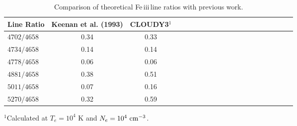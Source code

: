 \documentclass{emulateapj}
\def\unit #1{\,{\rm #1}}
\newcommand\cmcubei{\rm \,\unit{cm^{-3}}}
\newcommand\fe{Fe\,{\sc iii}\,}
\begin{document}




\begin{table}


{\footnotesize
\centering
\caption{ Comparison of theoretical \fe line ratios with previous work. } \label{Table:K93}
  \begin{tabular}{lccccccccccccccccccc} \hline\hline 
	
Line Ratio \hspace{0.6cm}	& Keenan et al. (1993)	&CLOUDY3$^1$ \\ \hline 

$4702/4658$		&0.34		&0.33\\	
$4734/4658$		&0.14		&0.14\\	

$4778/4658$		&0.06		&0.06	\\	
$4881/4658$		&0.38		&0.51	\\	
$5011/4658$		&0.07		&0.16	\\	
$5270/4658$		&0.32		&0.59	\\ 	



\hline \hline
\end{tabular} 

{$^1$Calculated at $T_e=10^4$ K and $N_e=10^4 \cmcubei$.}



}
\end{table}










\end{document}
